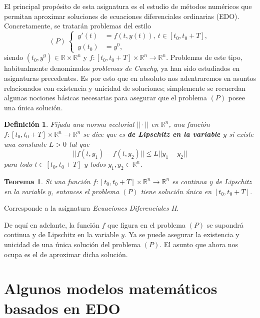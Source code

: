 \documentclass[11pt]{report}
\makeatletter
\renewenvironment{proof}[1][\proofname]{\par
  \pushQED{\qed}%
  \normalfont \topsep\z@skip %
  \trivlist
  \item[\hskip\labelsep
        \itshape
    #1\@addpunct{.}]\ignorespaces
}{%
  \popQED\endtrivlist\@endpefalse
}
\theoremstyle{mytheorem}
\newtheorem{theorem}{Teorema}
\theoremstyle{mydefinition}
\newtheorem{definition}{Definición}
\theoremstyle{myexample}
\let\oldproofname=\proofname
\renewcommand{\proofname}{\rm\bf{\oldproofname}}}
\newenvironment{cdefinition} %
  {\begin{mdframed}[
        linewidth=3pt,
        linecolor=c1,
        bottomline=false,
        topline=false,
        rightline=false,
        innerrightmargin=0pt,
        innertopmargin=0pt,
        innerbottommargin=0pt,
        innerleftmargin=1em, %
        skipabove=\baselineskip]
    \begin{definition}}
  {\end{definition}\end{mdframed}}
\newenvironment{ctheorem} %
  {\begin{mdframed}[
        linewidth=3pt,
        linecolor=c2,
        bottomline=false,
        topline=false,
        rightline=false,
        innerrightmargin=0pt,
        innertopmargin=0pt,
        innerbottommargin=0pt,
        innerleftmargin=1em, %
        skipabove=\baselineskip]
    \begin{theorem}}
  {\end{theorem}\end{mdframed}}
\newcommand{\R}{\mathbb R}
\newcommand{\mybf}[1]{\boldmath\textbf{\color{c1}#1}\unboldmath}
\makeatother
\begin{document}
El principal propósito de esta asignatura es el estudio de métodos numéricos que permitan aproximar soluciones de ecuaciones diferenciales ordinarias (EDO). Concretamente, se tratarán problemas del estilo
\[(P) \ \left\{
\begin{alignedat}{1}
\, y'(t)  &= f(t,y(t)), \ t \in [t_0,t_0+T], \\
\, y(t_0) &= y^0,
\end{alignedat}\right.\]
siendo $(t_0,y^0) \in \R \times \R^n$ y $f \colon [t_0,t_0+T] \times \R^n \to \R^n$. Problemas de este tipo, habitualmente denominados \emph{problemas de Cauchy}, ya han sido estudiados en asignaturas precedentes. Es por esto que en absoluto nos adentraremos en asuntos relacionados con existencia y unicidad de soluciones; simplemente se recuerdan algunas nociones básicas necesarias para asegurar que el problema $(P)$ posee una única solución.

\begin{cdefinition}
Fijada una norma vectorial $||\cdot||$ en $\R^n$, una función $f \colon [t_0,t_0+T] \times \R^n \to \R^n$ se dice que es \mybf{de Lipschitz en la variable $y$} si existe una constante $L>0$ tal que
\[||f(t,y_1)-f(t,y_2)||\leq L ||y_1-y_2||\]
para todo $t \in [t_0,t_0+T]$ y todos $y_1,y_2 \in \R^n$.
\end{cdefinition}

\begin{ctheorem}
    Si una función $f \colon [t_0,t_0+T] \times \R^n \to \R^n$ es continua y de Lipschitz en la variable $y$, entonces el problema $(P)$ tiene solución única en $[t_0,t_0+T]$.
\end{ctheorem}

\begin{proof}
Corresponde a la asignatura \emph{Ecuaciones Diferenciales II}.
\end{proof}

De aquí en adelante, la función $f$ que figura en el problema $(P)$ se supondrá continua y de Lipschitz en la variable $y$. Ya se puede asegurar la existencia y unicidad de una única solución del problema $(P)$. El asunto que ahora nos ocupa es el de aproximar dicha solución.

\section{Algunos modelos matemáticos basados en EDO}
\end{document}
